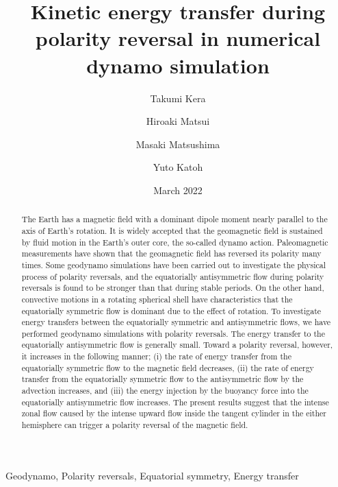 \documentclass[review]{elsarticle}
\date{March 2022}
\begin{document}
\title{Kinetic energy transfer during polarity reversal in numerical dynamo simulation}

\author[Tohoku]{Takumi Kera}
\author[ucd]{Hiroaki Matsui}
\author[TITECH]{Masaki Matsushima}
\author[Tohoku]{Yuto Katoh}

\address[Tohoku]{Department of Geophysics, Tohoku University, Sendai, Japan.}
\address[ucd]{Department of the Earth and Planetary Sciences, University of California, Davis, CA, USA.}
\address[TITECH]{Department of Earth and Planetary Sciences, Tokyo Institute of Technology, Tokyo, Japan.}

\begin{keyword}
Geodynamo, Polarity reversals, Equatorial symmetry, Energy transfer
\end{keyword}

\begin{abstract}
The Earth has a magnetic field with a dominant dipole moment nearly parallel to the axis of Earth’s rotation. 
{\color{teal}
It is widely accepted that the geomagnetic field is sustained by fluid motion in the Earth’s outer core, the so-called dynamo action.
}
Paleomagnetic measurements have shown that the geomagnetic field has reversed its polarity many times. 
Some geodynamo simulations have been carried out to investigate the physical process of polarity reversals, and the equatorially antisymmetric flow during polarity reversals is found to be stronger than that during stable periods. 
On the other hand, convective motions in a rotating spherical shell have characteristics that the equatorially symmetric flow is dominant due to the effect of rotation. 
{\color{teal}
To investigate energy transfers between the equatorially symmetric and antisymmetric flows, we have performed geodynamo simulations with polarity reversals.
}
The energy transfer to the equatorially antisymmetric flow is generally small.
{\color{teal}
Toward a polarity reversal, however, it increases in the following manner;
}
(i) the rate of energy transfer from the equatorially symmetric flow to the magnetic field decreases, (ii) the rate of energy transfer from the equatorially symmetric flow to the antisymmetric flow by the advection increases, and (iii) the energy injection by the buoyancy force into the equatorially antisymmetric flow increases.
The present results suggest that the intense zonal flow caused by the intense upward flow inside the tangent cylinder in the either hemisphere can trigger a polarity reversal of the magnetic field.
\end{abstract}
\end{document}
